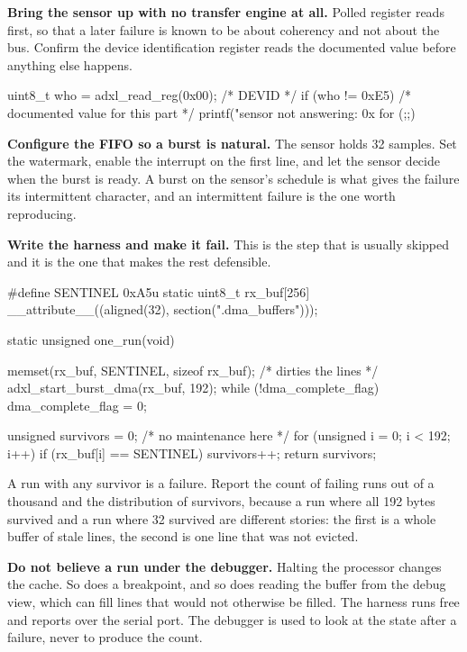 \begin{steps}
\item \textbf{Bring the sensor up with no transfer engine at all.} Polled
register reads first, so that a later failure is known to be about coherency
and not about the bus. Confirm the device identification register reads the
documented value before anything else happens.
\begin{ccode}
uint8_t who = adxl_read_reg(0x00);      /* DEVID */
if (who != 0xE5) {                      /* documented value for this part */
    printf("sensor not answering: 0x%
    for (;;) { }
}
\end{ccode}

\item \textbf{Configure the FIFO so a burst is natural.} The sensor holds 32
samples. Set the watermark, enable the interrupt on the first line, and let the
sensor decide when the burst is ready. A burst on the sensor's schedule is what
gives the failure its intermittent character, and an intermittent failure is
the one worth reproducing.

\item \textbf{Write the harness and make it fail.} This is the step that is
usually skipped and it is the one that makes the rest defensible.
\begin{ccode}
#define SENTINEL 0xA5u
static uint8_t rx_buf[256] __attribute__((aligned(32),
                                          section(".dma_buffers")));

static unsigned one_run(void)
{
    memset(rx_buf, SENTINEL, sizeof rx_buf);   /* dirties the lines */
    adxl_start_burst_dma(rx_buf, 192);
    while (!dma_complete_flag) { }
    dma_complete_flag = 0;

    unsigned survivors = 0;                    /* no maintenance here */
    for (unsigned i = 0; i < 192; i++)
        if (rx_buf[i] == SENTINEL) survivors++;
    return survivors;
}
\end{ccode}
A run with any survivor is a failure. Report the count of failing runs out of
a thousand and the distribution of survivors, because a run where all 192 bytes
survived and a run where 32 survived are different stories: the first is a
whole buffer of stale lines, the second is one line that was not evicted.

\item \textbf{Do not believe a run under the debugger.} Halting the processor
changes the cache. So does a breakpoint, and so does reading the buffer from
the debug view, which can fill lines that would not otherwise be filled. The
harness runs free and reports over the serial port. The debugger is used to
look at the state after a failure, never to produce the count.


\end{steps}
